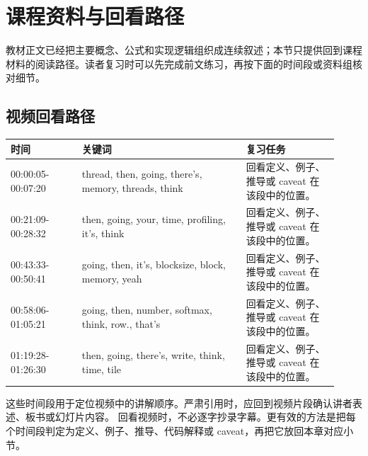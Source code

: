 \documentclass[a4paper]{article}
\begin{document}
\section{课程资料与回看路径}
教材正文已经把主要概念、公式和实现逻辑组织成连续叙述；本节只提供回到课程材料的阅读路径。读者复习时可以先完成前文练习，再按下面的时间段或资料组核对细节。
\subsection{视频回看路径}
\begin{longtable}{p{0.20\linewidth}p{0.46\linewidth}p{0.26\linewidth}}
\toprule
\textbf{时间} & \textbf{关键词} & \textbf{复习任务}\\
\midrule
00:00:05-00:07:20 & thread, then, going, there's, memory, threads, think & 回看定义、例子、推导或 caveat 在该段中的位置。\\
00:21:09-00:28:32 & then, going, your, time, profiling, it's, think & 回看定义、例子、推导或 caveat 在该段中的位置。\\
00:43:33-00:50:41 & going, then, it's, blocksize, block, memory, yeah & 回看定义、例子、推导或 caveat 在该段中的位置。\\
00:58:06-01:05:21 & going, then, number, softmax, think, row., that's & 回看定义、例子、推导或 caveat 在该段中的位置。\\
01:19:28-01:26:30 & then, going, there's, write, think, time, tile & 回看定义、例子、推导或 caveat 在该段中的位置。\\
\bottomrule
\end{longtable}
这些时间段用于定位视频中的讲解顺序。严肃引用时，应回到视频片段确认讲者表述、板书或幻灯片内容。
回看视频时，不必逐字抄录字幕。更有效的方法是把每个时间段判定为定义、例子、推导、代码解释或 caveat，再把它放回本章对应小节。
\end{document}
